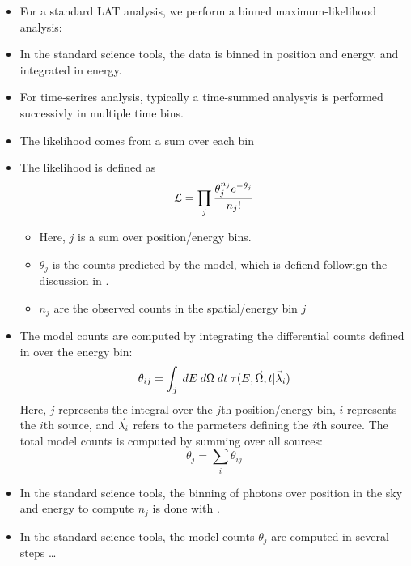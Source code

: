 
\begin{itemize}
  \item For a standard LAT analysis, we perform a binned maximum-likelihood analysis:
  \item In the standard science tools, the data is binned in position and energy.
    and integrated in energy.
  \item For time-serires analysis, typically a time-summed analysyis is performed successivly in
    multiple time bins.
  \item The likelihood comes from a sum over each bin
  \item The likelihood is defined as
    \begin{equation}
      \mathcal{L}=\prod_j \frac{\theta_j^{n_j} e^{-\theta_j}}{n_j!}
    \end{equation}
    \begin{itemize}
      \item Here, $j$ is a sum over position/energy bins.
      \item $\theta_j$ is the counts predicted by the model, which
        is defiend followign the discussion in .
      \item $n_j$ are the observed counts in the spatial/energy bin $j$
    \end{itemize}
  \item The model counts are computed by integrating the differential
    counts defined in  over the energy bin:
    \begin{equation}
      \theta_{ij} = \int_j \; dE \; 
      d\Omega \; dt \; 
      \tau(E,\vec\Omega,t|\vec\lambda_i)
    \end{equation}
    Here, $j$ represents the integral over the $j$th position/energy bin,
    $i$ represents the $i$th source, and $\vec\lambda_i$ refers to the
    parmeters defining the $i$th source. The total model counts
    is computed by summing over all sources:
    \begin{equation}
      \theta_j = \sum_i \theta_{ij}
    \end{equation}
  \item In the standard \fermi science tools, 
    the binning of photons over position in the sky and energy to compute $n_j$ 
    is done with \gtbin.
  \item In the standard \fermi science tools, the 
    model counts $\theta_j$ are computed in several steps \ldots


\end{itemize}

